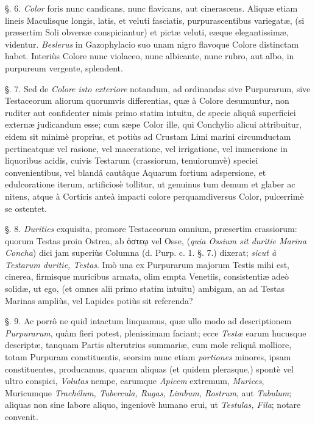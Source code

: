 \documentclass[a4paper, 11pt, oneside, polutonikogreek, german]{article}
\begin{document}
§. 6. \emph{Color} foris nunc candicans, nunc flavicans, aut cinerascens. Aliquæ etiam lineis Maculisque longis, latis, et veluti fasciatis, purpurascentibus variegatæ, (si præsertim Soli obversæ conspiciantur) et pictæ veluti, eæque elegantissimæ, videntur. \emph{Beslerus} in Gazophylacio suo unam nigro flavoque Colore distinctam habet. Interiùs Colore nunc violaceo, nunc albicante, nunc rubro, aut albo, in purpureum vergente, splendent.

§. 7. Sed de \emph{Colore isto exteriore} notandum, ad ordinandas sive Purpurarum, sive Testaceorum aliorum quorumvis differentias, quæ à Colore desumuntur, non ruditer aut confidenter nimis primo statim intuitu, de specie aliquâ superficiei externæ judicandum esse; cum sæpe Color ille, qui Conchylio alicui attribuitur, eidem sit minimè proprius, et potiùs ad Crustam Limi marini circumductam pertineatquæ vel rasione, vel maceratione, vel irrigatione, vel immersione in liquoribus acidis, cuivis Testarum (crassiorum, tenuiorumvè) speciei convenientibus, vel blandâ cautâque Aquarum fortium adspersione, et edulcoratione iterum, artificiosè tollitur, ut genuinus tum demum et glaber ac nitens, atque à Corticis anteà impacti colore perquamdiversus Color, pulcerrimè se ostentet.

§. 8. \emph{Durities} exquisita, promore Testaceorum omnium, præsertim crassiorum: quorum Testas proin Ostrea, ab ὀστεῳ vel Osse, (\emph{quia Ossium sit duritie Marina Concha}) dici jam superiùs Columna (d. Purp. c. 1. §. 7.) dixerat; \emph{sicut à Testarum duritie, Testas}. Imò una ex Purpurarum majorum Testis mihi est, cinerea, firmisque muricibus armata, olim empta Venetiis, consistentiæ adeò solidæ, ut ego, (et omnes alii primo statim intuitu) ambigam, an ad Testas Marinas ampliùs, vel Lapides potiùs sit referenda?

§. 9. Ac porrô ne quid intactum linquamus, quæ ullo modo ad descriptionem \emph{Purpurarum}, quàm fieri potest, plenissimam faciant; ecce \emph{Testæ} earum hucusque descriptæ, tanquam Partis alterutrius summariæ, cum mole reliquâ molliore, totam Purpuram constituentis, seorsim nunc etiam \emph{portiones} minores, ipsam constituentes, producamus, quarum aliquas (et quidem plerasque,) spontè vel ultro conspici, \emph{Volutas} nempe, earumque \emph{Apicem} extremum, \emph{Murices}, Muricumque \emph{Trachélum, Tubercula, Rugas, Limbum, Rostrum}, aut \emph{Tubulum}; aliquas non sine labore aliquo, ingeniovè humano erui, ut \emph{Testulas, Fila}; notare convenit.
\end{document}
